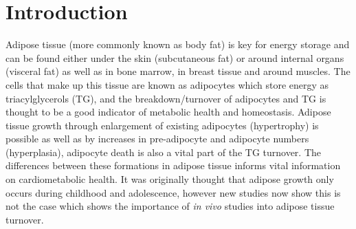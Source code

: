 \documentclass[class=article, crop=false]{standalone}
\begin{document}
 
\label{section:Lipid}

\section{Introduction}

Adipose tissue (more commonly known as body fat) is key for energy storage and can be found either under the skin (subcutaneous fat) or around internal organs (visceral fat) as well as in bone marrow, in breast tissue and around muscles. The cells that make up this tissue are known as adipocytes which store energy as triacylglycerols (TG), and the breakdown/turnover of adipocytes and TG is thought to be a good indicator of metabolic health and homeostasis. Adipose tissue growth through enlargement of existing adipocytes (hypertrophy) is possible as well as by increases in pre-adipocyte and adipocyte numbers (hyperplasia), adipocyte death is also a vital part of the TG turnover\cite{White2019DynamicsDisease}. The differences between these formations in adipose tissue informs vital information on cardiometabolic health\cite{Carnethon2002Serum19871998}. It was originally thought that adipose growth only occurs during childhood and adolescence\cite{Salans1973StudiesPatients}, however new studies now show this is not the case\cite{White2016DifferencesWomen} which shows the importance of \textit{in vivo} studies into adipose tissue turnover.
\end{document}
